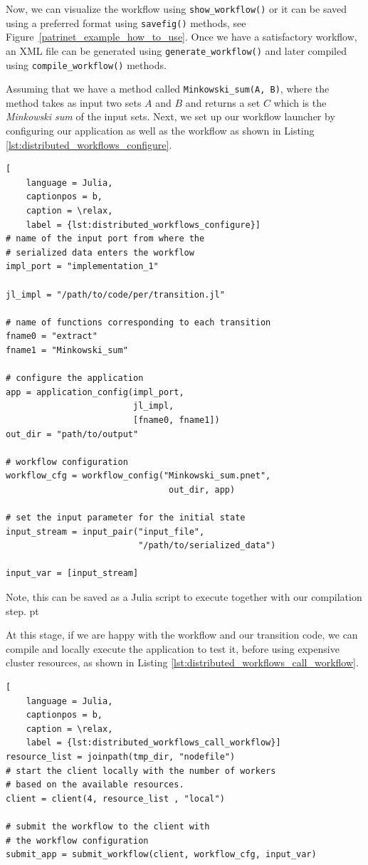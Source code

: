 \documentclass{juliacon}
\begin{document}
Now, we can visualize the workflow using \verb+show_workflow()+ or it can be saved using a preferred format using \verb+savefig()+ methods, see Figure~\ref{patrinet_example_how_to_use}.
Once we have a satisfactory workflow, an XML file can be generated using \verb+generate_workflow()+ and later compiled using \verb+compile_workflow()+ methods.\vskip 6pt

Assuming that we have a method called \verb+Minkowski_sum(A, B)+, where the method takes as input two sets $A$ and $B$ and returns a set $C$ which is the \emph{Minkowski sum} of the input sets.
Next, we set up our workflow launcher by configuring our application as well as the workflow as shown in Listing \ref{lst:distributed_workflows_configure}.

\begin{lstlisting}[
    language = Julia,
    captionpos = b,
    caption = \relax,
    label = {lst:distributed_workflows_configure}]
# name of the input port from where the 
# serialized data enters the workflow
impl_port = "implementation_1"

jl_impl = "/path/to/code/per/transition.jl"

# name of functions corresponding to each transition
fname0 = "extract"
fname1 = "Minkowski_sum"

# configure the application
app = application_config(impl_port, 
                         jl_impl, 
                         [fname0, fname1])
out_dir = "path/to/output"

# workflow configuration 
workflow_cfg = workflow_config("Minkowski_sum.pnet", 
                                out_dir, app)

# set the input parameter for the initial state
input_stream = input_pair("input_file", 
                          "/path/to/serialized_data")

input_var = [input_stream]
\end{lstlisting}

Note, this can be saved as a Julia script to execute together with our compilation step. pt

At this stage, if we are happy with the workflow and our transition code, we can compile and locally execute the application to test it, before using expensive cluster resources, as shown in Listing \ref{lst:distributed_workflows_call_workflow}.

\begin{lstlisting}[
    language = Julia,
    captionpos = b,
    caption = \relax,
    label = {lst:distributed_workflows_call_workflow}]
resource_list = joinpath(tmp_dir, "nodefile")
# start the client locally with the number of workers 
# based on the available resources.
client = client(4, resource_list , "local")

# submit the workflow to the client with 
# the workflow configuration
submit_app = submit_workflow(client, workflow_cfg, input_var)
\end{lstlisting}
\end{document}
